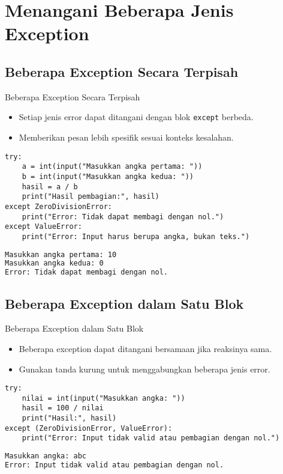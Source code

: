 \documentclass[aspectratio=169, table]{beamer}
\begin{document}
\section{Menangani Beberapa Jenis Exception}

\subsection*{Beberapa Exception Secara Terpisah}
\begin{frame}[fragile]{Beberapa Exception Secara Terpisah}
\vspace*{20pt}
\begin{itemize}
  \item Setiap jenis error dapat ditangani dengan blok \texttt{except} berbeda.
  \item Memberikan pesan lebih spesifik sesuai konteks kesalahan.
\end{itemize}

\begin{lstlisting}[style=PythonStyle]
try:
    a = int(input("Masukkan angka pertama: "))
    b = int(input("Masukkan angka kedua: "))
    hasil = a / b
    print("Hasil pembagian:", hasil)
except ZeroDivisionError:
    print("Error: Tidak dapat membagi dengan nol.")
except ValueError:
    print("Error: Input harus berupa angka, bukan teks.")
\end{lstlisting}

\begin{lstlisting}[language=bash]
Masukkan angka pertama: 10
Masukkan angka kedua: 0
Error: Tidak dapat membagi dengan nol.
\end{lstlisting}
\end{frame}

\subsection*{Beberapa Exception dalam Satu Blok}
\begin{frame}[fragile]{Beberapa Exception dalam Satu Blok}
\vspace*{20pt}
\begin{itemize}
  \item Beberapa exception dapat ditangani bersamaan jika reaksinya sama.
  \item Gunakan tanda kurung untuk menggabungkan beberapa jenis error.
\end{itemize}

\begin{lstlisting}[style=PythonStyle]
try:
    nilai = int(input("Masukkan angka: "))
    hasil = 100 / nilai
    print("Hasil:", hasil)
except (ZeroDivisionError, ValueError):
    print("Error: Input tidak valid atau pembagian dengan nol.")
\end{lstlisting}

\begin{lstlisting}[language=bash]
Masukkan angka: abc
Error: Input tidak valid atau pembagian dengan nol.
\end{lstlisting}
\end{frame}
\end{document}

